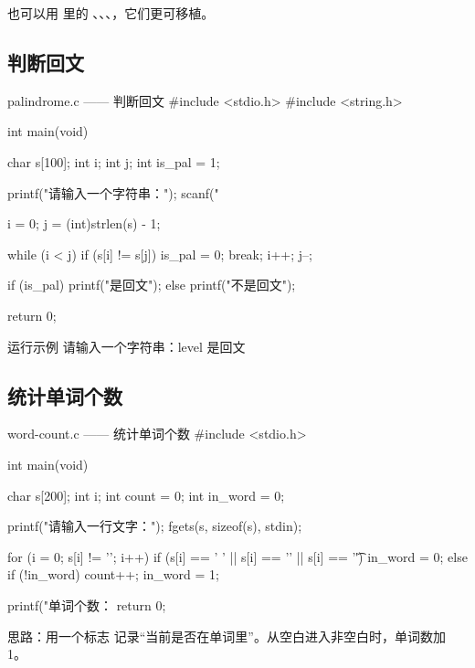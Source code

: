 也可以用  里的 、、、，它们更可移植。

\subsection{判断回文}

\begin{codebox}{palindrome.c —— 判断回文}
#include <stdio.h>
#include <string.h>

int main(void)
{
    char s[100];
    int i;
    int j;
    int is_pal = 1;

    printf("请输入一个字符串：");
    scanf("%

    i = 0;
    j = (int)strlen(s) - 1;

    while (i < j) {
        if (s[i] != s[j]) {
            is_pal = 0;
            break;
        }
        i++;
        j--;
    }

    if (is_pal) {
        printf("是回文\n");
    } else {
        printf("不是回文\n");
    }

    return 0;
}
\end{codebox}

\begin{outbox}{运行示例}
请输入一个字符串：level
是回文
\end{outbox}

\subsection{统计单词个数}

\begin{codebox}{word-count.c —— 统计单词个数}
#include <stdio.h>

int main(void)
{
    char s[200];
    int i;
    int count = 0;
    int in_word = 0;

    printf("请输入一行文字：");
    fgets(s, sizeof(s), stdin);

    for (i = 0; s[i] != '\0'; i++) {
        if (s[i] == ' ' || s[i] == '\n' || s[i] == '\t') {
            in_word = 0;
        } else {
            if (!in_word) {
                count++;
                in_word = 1;
            }
        }
    }

    printf("单词个数：%
    return 0;
}
\end{codebox}

思路：用一个标志  记录“当前是否在单词里”。从空白进入非空白时，单词数加 1。

